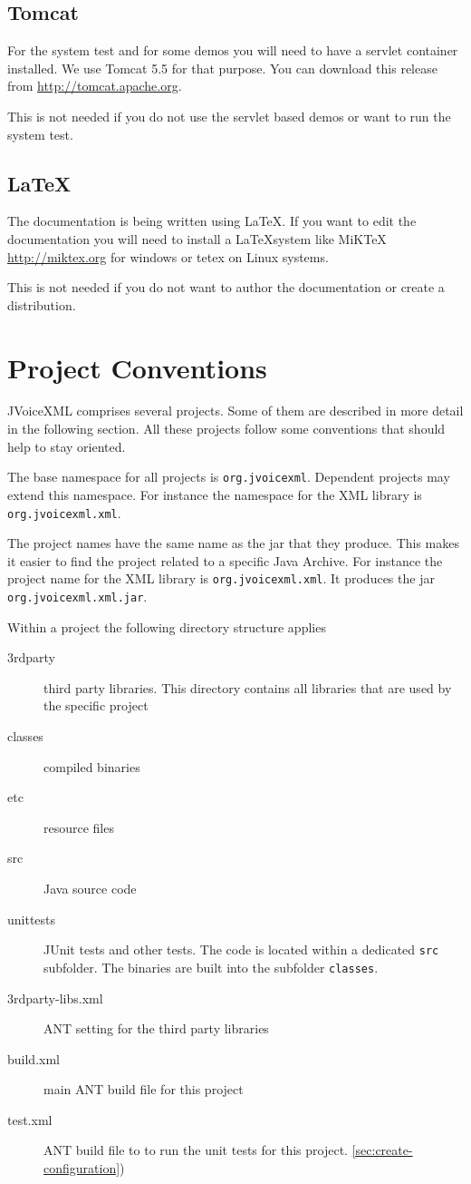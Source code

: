 \documentclass[11pt,a4paper]{article}
\begin{document}
\subsection{Tomcat}
\label{sec:tomcat}

For the system test and for some demos you will need to have a servlet
container installed. We use Tomcat 5.5 for that purpose. You can download this
release from \url{http://tomcat.apache.org}.

This is not needed if you do not use the servlet based demos or want to run the
system test.

\subsection{\LaTeX}

The documentation is being written using \LaTeX. If you want to edit the
documentation you will need to install a \LaTeX system like MiKTeX
\url{http://miktex.org} for windows or tetex on Linux systems.

This is not needed if you do not want to author the documentation or create a
distribution.

\section{Project Conventions}

JVoiceXML comprises several projects. Some of them are described in more
detail in the following section. All these projects follow some conventions
that should help to stay oriented.

The base namespace for all projects is \lstinline{org.jvoicexml}. Dependent 
projects may extend this namespace. For instance the namespace for the
XML library is \lstinline{org.jvoicexml.xml}.

The project names have the same name as the jar that they produce. This
makes it easier to find the project related to a specific Java Archive.
For instance the project name for the XML library is
\lstinline{org.jvoicexml.xml}. It produces the jar
\texttt{org.jvoicexml.xml.jar}.

Within a project the following directory structure applies

\begin{description}
\item[3rdparty] third party libraries. This directory contains all libraries
that are used by the specific project 
\item[classes] compiled binaries
\item[etc] resource files
\item[src] Java source code
\item[unittests] JUnit tests and other tests. The code is located within a
dedicated \texttt{src} subfolder. The binaries are built into the subfolder
\texttt{classes}.
\item[3rdparty-libs.xml] ANT setting for the third party libraries
\item[build.xml] main ANT build file for this project
\item[test.xml] ANT build file to to run the unit tests for this project.
\ref{sec:create-configuration})
\end{description}
\end{document}
